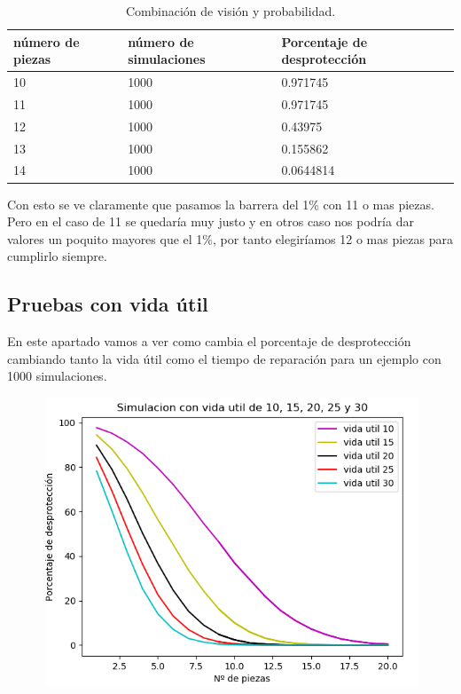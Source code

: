 \documentclass[]{article}
\begin{document}
 \begin{table}[H]
	\begin{center}
		\resizebox{12.5cm}{!} {
			\begin{tabular}{|l|l|l|}
				\hline
				número de piezas & número de simulaciones & Porcentaje de desprotección \\
				\hline \hline
				10 & 1000 & 0.971745
				\\ \hline
				11 & 1000 & 0.971745
				\\ \hline
				12 & 1000 & 0.43975
				\\ \hline
				13 & 1000 & 0.155862
				\\ \hline
				14 & 1000 & 0.0644814
				\\ \hline
			\end{tabular}
		}
		\caption{Combinación de visión y probabilidad.}
		\label{tabla:sencilla}
	\end{center}
\end{table}

Con esto se ve claramente que pasamos la barrera del 1\% con 11 o mas piezas. Pero en el caso de 11 se quedaría muy justo y en otros caso nos podría dar valores un poquito mayores que el 1\%, por tanto elegiríamos 12 o mas piezas para cumplirlo siempre. 

\subsection{Pruebas con vida útil}
En este apartado vamos a ver como cambia el porcentaje de desprotección cambiando tanto la vida útil como el tiempo de reparación para un ejemplo con 1000 simulaciones.

\begin{figure}[H]
	\centering
	\includegraphics[width=1\linewidth]{img/screenshot0018}
	\label{fig:screenshot0018}
\end{figure}
\end{document}
